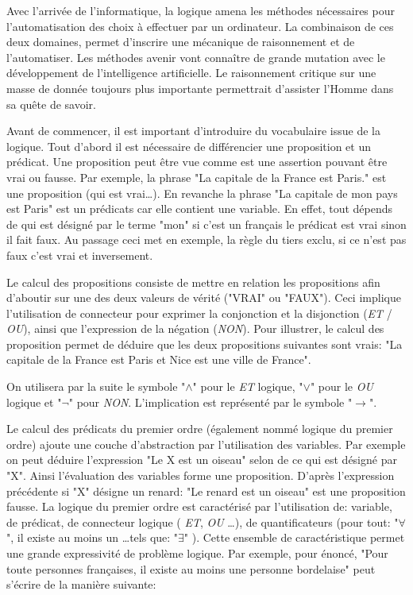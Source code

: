 \begin{refsegment}
    Avec l'arrivée de l'informatique, la logique amena les méthodes nécessaires pour l'automatisation des choix à effectuer par un ordinateur. La combinaison de ces deux domaines, permet d'inscrire une mécanique de raisonnement et de l'automatiser. Les méthodes avenir vont connaître de grande mutation avec le développement de l'intelligence artificielle. Le raisonnement critique sur une masse de donnée toujours plus importante permettrait d'assister l'Homme dans sa quête de savoir.
    
    
    Avant de commencer, il est important d'introduire du vocabulaire issue de la logique. Tout d'abord il est nécessaire de différencier une proposition et un prédicat.  Une proposition peut être vue comme est une assertion pouvant être vrai ou fausse. Par exemple, la phrase "La capitale de la France est Paris." est une proposition (qui est vrai\ldots). En revanche la phrase "La capitale de mon pays est Paris" est un prédicats car elle contient une variable. En effet, tout dépends de qui est désigné par le terme "mon" si c'est un français le prédicat est vrai sinon il fait faux. Au passage ceci met en exemple, la règle du tiers exclu, si ce n'est pas faux c'est vrai et inversement.
    
    Le calcul des propositions consiste de mettre en relation les propositions afin d'aboutir sur une des deux valeurs de vérité ("VRAI" ou "FAUX"). Ceci implique l'utilisation de connecteur pour exprimer la conjonction et la disjonction (\textit{ET} / \textit{OU}), ainsi que l'expression de la négation (\textit{NON}). Pour illustrer, le calcul des proposition permet de déduire que les deux propositions suivantes sont vrais: "La capitale de la France est Paris et Nice est une ville de France".
    
    On utilisera par la suite le symbole "$\land$" pour le \textit{ET} logique, "$\lor$" pour le \textit{OU} logique et "$\lnot$" pour \textit{NON}. L'implication est représenté par le symbole "$\rightarrow$". 
    
    Le calcul des prédicats du premier ordre (également nommé logique du premier ordre) ajoute une couche d'abstraction par l'utilisation des variables. Par exemple on peut déduire l'expression "Le X est un oiseau" selon de ce qui est désigné par "X". Ainsi l'évaluation des variables forme une proposition. D'après l'expression précédente si "X" désigne un renard: "Le renard est un oiseau" est une proposition fausse. La logique du premier ordre est caractérisé par l'utilisation de: variable, de prédicat, de connecteur logique ( \textit{ET}, \textit{OU} \ldots), de quantificateurs (pour tout: "$\forall$", il existe au moins un \ldots tels que: "$\exists$" ). Cette ensemble de caractéristique permet une grande expressivité de problème logique. Par exemple, pour énoncé, "Pour toute personnes françaises, il existe au moins une personne bordelaise" peut s'écrire de la manière suivante:\nolisttopbreak
    

\end{refsegment}
